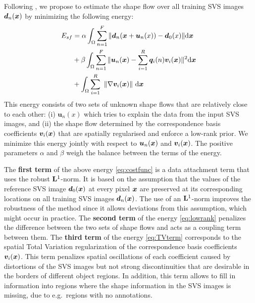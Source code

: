 Following \cite{Garg:2013hu}, we propose to estimate the shape flow over all training SVS images $\bm{d}_n(\boldsymbol{x})$ by minimizing the following energy:
\begin{align}
E_{sf} & =\alpha
\int_{\Omega}\sum_{n=1}^F \|\bm{d}_n(\boldsymbol{x}+\bm{u}_n(x))-\bm{d}_0(x)\| \mathrm{d} \boldsymbol{x} \label{eq:costfunc}\\
    &+ \beta \int_{\Omega}\sum_{n=1}^F\|\bm{u}_n(\boldsymbol{x})-\sum_{i=1}^R\bm{q}_i(n)\bm{v}_i(\boldsymbol{x})\|^2 \mathrm{d} \boldsymbol{x} \label{eq:lowrank}\\
    &+
\int_\Omega  \sum_{i=1}^R \,\, \left \|    \nabla \bm{v}_i(\boldsymbol{x})    \right \|  \,\mathrm{d} \boldsymbol{x} \label{eq:TVterm}
\end{align}
This energy consists of two sets of unknown shape flows that are relatively close to each other: (i) $\bm{u}_n(x)$ which tries to explain the data from the input SVS images, and (ii) the shape flow determined by the correspondence basis coefficients $\bm{v}_i(\boldsymbol{x})$ that are spatially regularised and enforce a low-rank prior. We minimize this energy jointly with respect to $\bm{u}_n(\boldsymbol{x})$ and $\bm{v}_i(\boldsymbol{x})$. The positive parameters $\alpha$ and $\beta$ weigh the balance between the terms of the energy.

The \textbf{first term} of the above energy \eqref{eq:costfunc} is a data attachment term
that uses the robust $\mathbf{L}^1$-norm.  It is based on the assumption that the values of the reference SVS image $\bm{d}_0(\boldsymbol{x})$ at every pixel $\boldsymbol{x}$ are preserved at its corresponding locations on all training SVS images $\bm{d}_n(\boldsymbol{x})$. The use of an $\mathbf{L}^1$-norm improves the robustness of the method since it allows deviations from this assumption, which might occur in practice.
The \textbf{second term} of the energy \eqref{eq:lowrank} penalizes the difference between the two sets  of shape flows and acts as a coupling term between them.
The \textbf{third term} of the energy \eqref{eq:TVterm} corresponds to the spatial Total Variation regularization \cite{rudin92} of
the correspondence basis coefficients $\bm{v}_i(\boldsymbol{x})$.
This term penalizes spatial oscillations of each coefficient caused by distortions of the SVS images but not strong discontinuities that are desirable in the borders of different object regions. In addition, this term allows to fill in information into regions where the shape information in the SVS images is missing, due to e.g.~regions with no annotations.

